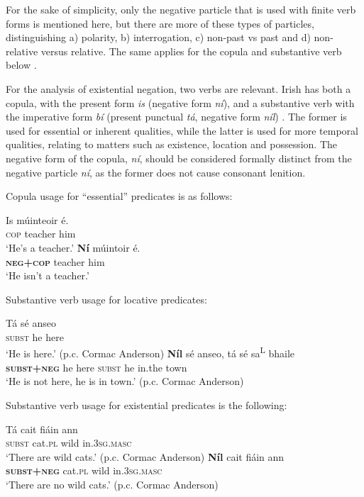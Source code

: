 ﻿\documentclass[output=paper]{langsci/langscibook}
\begin{document}
\begin{unindented}
For the sake of simplicity, only the negative particle that is used with
finite verb forms is mentioned here, but there are more of these types of
particles, distinguishing a) polarity, b) interrogation, c) non-past vs
past and d) non-relative versus relative. The same applies for the copula
and substantive verb below \parencite[see][93]{Stenson1981}. 

For the analysis of existential negation, two verbs are relevant. Irish has both a copula, with the present form \textit{is} (negative form \textit{ní}), and a substantive verb with the imperative form \textit{bí} (present punctual \textit{tá}, negative form \textit{níl}) \citep[94]{Stenson1981}. The former is used for essential or inherent qualities, while the latter is used for more temporal qualities, relating to matters such as existence, location and possession. The negative form of the copula, \textit{ní}, should be considered formally distinct from the negative particle \textit{ní}, as the former does not cause consonant lenition. 

Copula usage for ``essential'' predicates is as follows:
%
\begin{exe}\ex \gll Is múinteoir é.  \\
\textsc{cop} teacher him \\
    \glt `He's a teacher.' \citep[132]{Stenson1981}
\ex \gll \textbf{Ní} múintoir é.  \\
\textbf{\textsc{neg+cop}} teacher   him \\
    \glt `He isn't a teacher.' \citep[132]{Stenson1981}
    \end{exe}

Substantive verb usage for locative predicates:
%
\begin{exe}\ex \gll Tá sé anseo \\
\textsc{subst} he here \\
    \glt `He is here.' (p.c. Cormac Anderson)
\ex \gll \textbf{Níl} sé anseo,  tá sé sa\textsuperscript{L} bhaile \\
\textbf{\textsc{subst+neg}} he here \textsc{subst} he in.the  town \\
    \glt `He is not here, he is in town.' (p.c. Cormac Anderson)
    \end{exe}

Substantive verb usage for existential predicates is the following:
%
\begin{exe}\ex \gll Tá cait    fiáin ann \\
\textsc{subst} cat.\textsc{pl} wild in.\textsc{3sg.masc} \\
    \glt `There are wild cats.' (p.c. Cormac Anderson)
\ex \gll \textbf{Níl} cait   fiáin ann \\
\textbf{\textsc{subst+neg}} cat.\textsc{pl} wild in.\textsc{3sg.masc} \\
    \glt `There are no wild cats.' (p.c. Cormac Anderson)
    \end{exe}


\end{unindented}
\end{document}
